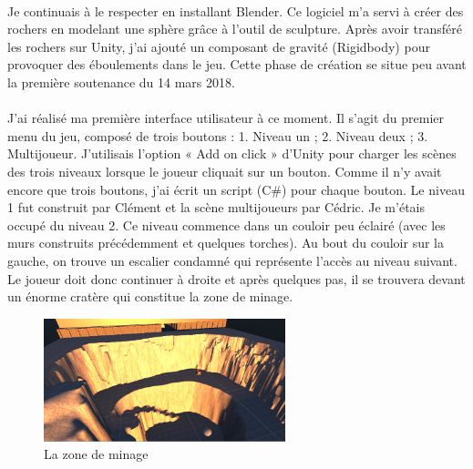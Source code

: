 \documentclass[titlepage, 13px, a4paper]{report}
\begin{document}
\paragraph*{} \hspace{0pt} 
Je continuais à le respecter en installant Blender. Ce logiciel m'a servi à créer des
rochers en modelant une sphère grâce à l'outil de sculpture. Après avoir transféré
les rochers sur Unity, j'ai ajouté un composant de gravité (Rigidbody) pour provoquer des
éboulements dans le jeu. Cette phase de création se situe peu avant la première
soutenance du 14 mars 2018. \\


\paragraph*{} \hspace{0pt} 
J'ai réalisé ma première interface utilisateur à ce moment. Il s'agit du premier menu
du jeu, composé de trois boutons : 1. Niveau un ; 2. Niveau deux ; 3. Multijoueur.
J'utilisais l'option « Add on click » d'Unity pour charger les scènes des trois niveaux
lorsque le joueur cliquait sur un bouton. Comme il n'y avait encore que trois
boutons, j'ai écrit un script (C\#) pour chaque bouton. Le niveau 1 fut construit par
Clément et la scène multijoueurs par Cédric. Je m'étais occupé du niveau 2. Ce
niveau commence dans un couloir peu éclairé (avec les murs construits
précédemment et quelques torches). Au bout du couloir sur la gauche, on trouve un
escalier condamné qui représente l'accès au niveau suivant. Le joueur doit donc
continuer à droite et après quelques pas, il se trouvera devant un énorme cratère
qui constitue la zone de minage. 
\begin{figure}
  \centering
  \includegraphics[width=7cm]{images/antoine_cratere.png}
  \caption{La zone de minage}
\end{figure}
\\
\end{document}
